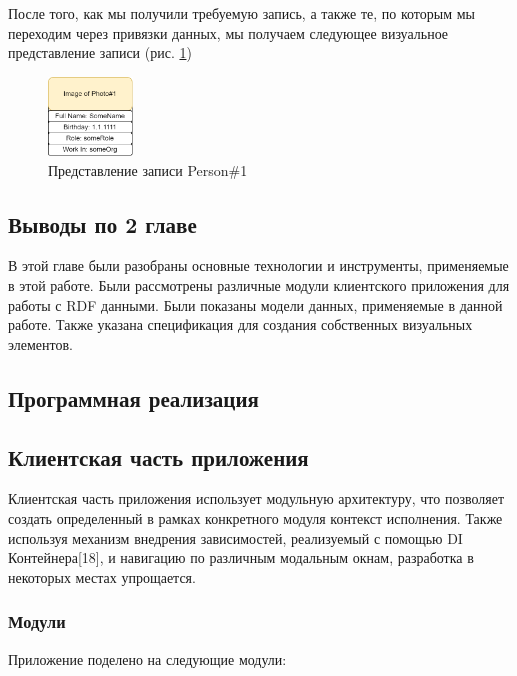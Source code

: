 \documentclass[12pt]{article}
\begin{document}
После того, как мы получили требуемую запись, а также те, по которым мы переходим через привязки данных, мы получаем следующее визуальное представление записи (рис. \ref{fig:rdf_vis_result})

\begin{figure}
    \centering
    \includegraphics[width=0.2\textwidth]{_images/rdf_vis_result.png}
    \caption{Представление записи Person\#1}
    \label{fig:rdf_vis_result}
\end{figure}

\subsection{Выводы по 2 главе}
В этой главе были разобраны основные технологии и инструменты, применяемые в этой работе. Были рассмотрены различные модули клиентского приложения для работы с RDF данными. Были показаны модели данных, применяемые в данной работе. Также указана спецификация для создания собственных визуальных элементов.

\pagebreak

\begin{center}
    {\section{Программная реализация}}
\end{center}

\subsection{Клиентская часть приложения}
\qquad Клиентская часть приложения использует модульную архитектуру, что позволяет создать определенный в рамках конкретного модуля контекст исполнения. Также используя механизм внедрения зависимостей, реализуемый с помощью DI Контейнера[18], и навигацию по различным модальным окнам, разработка в некоторых местах упрощается.

\subsubsection{Модули}
\qquad Приложение поделено на следующие модули:
\end{document}
